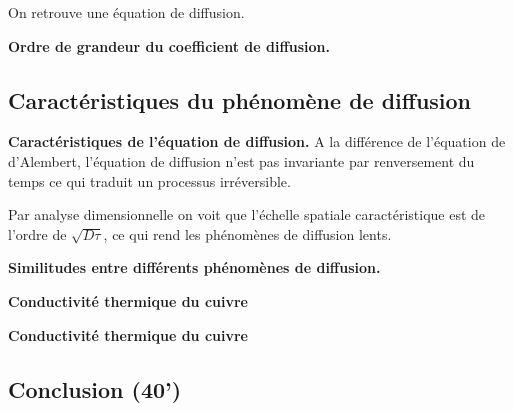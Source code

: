 On retrouve une équation de diffusion.

\begin{slide}
\textbf{Ordre de grandeur du coefficient de diffusion.}
\end{slide}

\subsection{Caractéristiques du phénomène de diffusion}

\begin{slide}
\textbf{Caractéristiques de l'équation de diffusion.}
A la différence de l'équation de d'Alembert, l'équation de diffusion n'est pas invariante par renversement du temps ce qui traduit un processus irréversible.
\end{slide}

Par analyse dimensionnelle on voit que l'échelle spatiale caractéristique est de l'ordre de $\sqrt{D\tau}$, ce qui rend les phénomènes de diffusion lents.

\begin{slide}
\textbf{Similitudes entre différents phénomènes de diffusion.}
\end{slide}

\begin{slide}
\textbf{Conductivité thermique du cuivre}
\end{slide}

\begin{experience}
\textbf{Conductivité thermique du cuivre}
\end{experience}

\subsection{Conclusion (40')}

\newpage